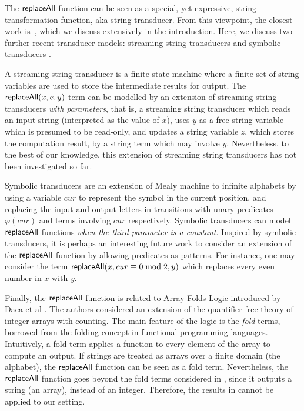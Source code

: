 


The $\mathsf{replaceAll}$ function can be seen as a special, yet expressive, string transformation function, aka string transducer. From this viewpoint, the closest work is~\cite{LB16}, which we discuss extensively in the introduction. Here, we discuss two further 
recent transducer models: streaming string transducers \cite{AC10} and symbolic transducers \cite{symbolic-transducer}. 

A streaming string transducer is a finite state machine where  a finite set of string variables are used to store the intermediate results for output. The $\mathsf{replaceAll}(x, e, y)$ term can be modelled by an extension of streaming string transducers \emph{with parameters}, that is, a streaming string transducer which reads an input string (interpreted as the value of $x$), uses $y$ as a free string variable which is presumed to be read-only, and updates a string variable $z$, which stores the computation result, by a string term which may involve $y$. Nevertheless, to the best of our knowledge, this extension of streaming string transducers has not been investigated so far. 

Symbolic transducers are an extension of Mealy machine to infinite alphabets by using a variable $cur$ to represent the symbol in the current position, and replacing the input and output letters in transitions with unary predicates $\varphi(cur)$ and terms involving $cur$ respectively. Symbolic transducers can model $\mathsf{replaceAll}$ functions \emph{when the third parameter is a constant}. Inspired by symbolic transducers, it is perhaps an interesting future work to consider an extension of the $\mathsf{replaceAll}$ function by allowing predicates as patterns. %
For instance, one may consider the term $\mathsf{replaceAll}(x, cur \equiv 0 \bmod 2, y)$ which replaces every even number in $x$ with $y$. %

Finally, the $\mathsf{replaceAll}$ function is related to Array Folds Logic introduced by Daca et al \cite{DHK16}. The authors considered an extension of the quantifier-free theory of integer arrays with counting. The main feature of the logic is the \emph{fold} terms, borrowed from the folding concept in functional programming languages. Intuitively, a fold term applies a function to every element of the array to compute an output. If strings are treated as arrays over a finite domain (the alphabet), the $\mathsf{replaceAll}$ function can be seen as a fold term. Nevertheless, the $\mathsf{replaceAll}$ function goes beyond the fold terms considered in \cite{DHK16}, since it outputs a string (an array), instead of an integer. Therefore, the results in \cite{DHK16} cannot be applied to our setting.

